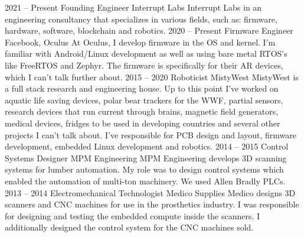 \documentclass[9pt]{developercv} %
\begin{document}
\begin{entrylist}
    \entry
		{2021 -- Present}
		{Founding Engineer}
		{Interrupt Labs}
        {
        Interrupt Labs in an engineering consultancy that specializes in various fields, such as: firmware, hardware, software, blockchain and robotics.
        }
	\entry
		{2020 -- Present}
		{Firmware Engineer}
		{Facebook, Oculus}
        {
        At Oculus, I develop firmware in the OS and kernel. I'm familiar with Android/Linux development as well as using bare metal RTOS's like FreeRTOS and Zephyr. The firmware is specifically for their AR devices, which I can't talk further about.
        }
	\entry
		{2015 -- 2020}
		{Roboticist}
		{MistyWest}
        {
        MistyWest is a full stack research and engineering house. Up to this point I've worked on aquatic life saving devices, polar bear trackers for the WWF, partial sensors, research devices that run current through brains, magnetic field generators, medical devices, fridges to be used in developing countries and several other projects I can't talk about.  I've responsible for PCB design and layout, firmware development, embedded Linux development and robotics.
        }
    \entry
		{2014 -- 2015}
		{Control Systems Designer}
		{MPM Engineering}
		{
        MPM Engineering develops 3D scanning systems for lumber automation. My role was to design control systems which enabled the automation of multi-ton machinery. We used Allen Bradly PLCs.
        }
	\entry
		{2013 -- 2014}
		{Electromechanical Technologist}
		{Medico Supplies}
		{
        Medico designs 3D scanners and CNC machines for use in the prosthetics industry. I was responsible for designing and testing the embedded compute inside the scanners. I additionally designed the control system for the CNC machines sold.
        }
\end{entrylist}


\end{document}
